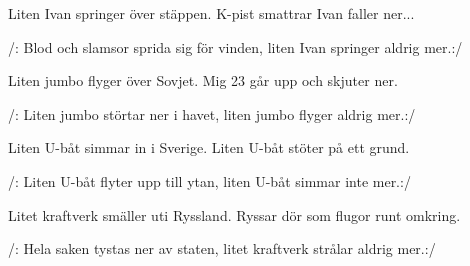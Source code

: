 


	
\beginverse*		%
Liten Ivan springer över stäppen.
K-pist smattrar Ivan faller ner...
\endverse			%

\beginchorus
/: Blod och slamsor sprida sig för vinden,
liten Ivan springer aldrig mer.:/
\endchorus

\beginverse*		%
Liten jumbo flyger över Sovjet.
Mig 23 går upp och skjuter ner.
\endverse			%

\beginchorus
/: Liten jumbo störtar ner i havet,
liten jumbo flyger aldrig mer.:/
\endchorus

\beginverse*		%
Liten U-båt simmar in i Sverige.
Liten U-båt stöter på ett grund.
\endverse			%

\beginchorus
/: Liten U-båt flyter upp till ytan,
liten U-båt simmar inte mer.:/
\endchorus

\beginverse*		%
Litet kraftverk smäller uti Ryssland.
Ryssar dör som flugor runt omkring.
\endverse			%

\beginchorus
/: Hela saken tystas ner av staten,
litet kraftverk strålar aldrig mer.:/
\endchorus
\endsong			%
